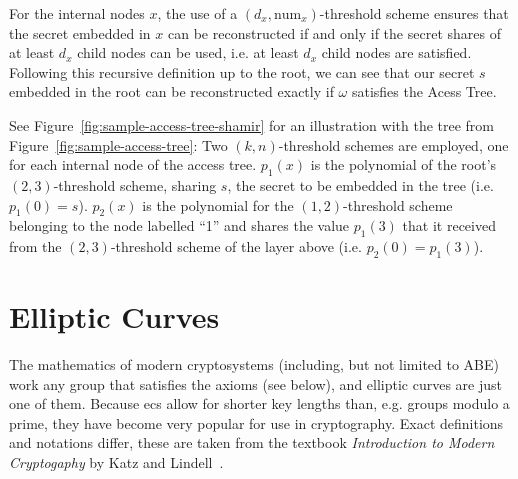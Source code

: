 For the internal nodes $x$, the use of a $(d_x, \text{num}_x)$-threshold scheme ensures that the secret embedded in $x$ can be reconstructed if and only if the secret shares of at least $d_x$ child nodes can be used, i.e. at least $d_x$ child nodes are satisfied.
Following this recursive definition up to the root, we can see that our secret $s$ embedded in the root can be reconstructed exactly if $\omega$ satisfies the Acess Tree.

See Figure~\ref{fig:sample-access-tree-shamir} for an illustration with the tree from Figure~\ref{fig:sample-access-tree}:
Two $(k,n)$-threshold schemes are employed, one for each internal node of the access tree.
$p_1(x)$ is the polynomial of the root's $(2,3)$-threshold scheme, sharing $s$, the secret to be embedded in the tree (i.e. $p_1(0) = s$).
$p_2(x)$ is the polynomial for the $(1,2)$-threshold scheme belonging to the node labelled ``1'' and shares the value $p_1(3)$ that it received from the $(2,3)$-threshold scheme of the layer above (i.e. $p_2(0) = p_1(3)$).

\section{Elliptic Curves}
\label{sec:ec}

The mathematics of modern cryptosystems (including, but not limited to ABE) work any group that satisfies the axioms (see below), and elliptic curves are just one of them.
Because \Glspl{ec} allow for shorter key lengths than, e.g. groups modulo a prime, they have become very popular for use in cryptography.
Exact definitions and notations differ, these are taken from the textbook \emph{Introduction to Modern Cryptogaphy} by Katz and Lindell~\cite{katz_introduction_2015}.

